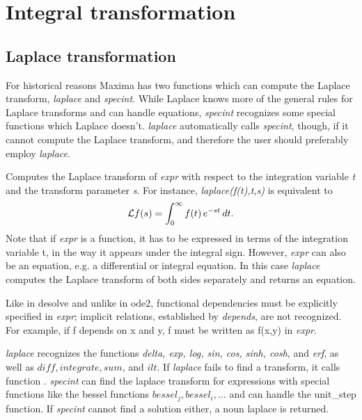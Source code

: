 \documentclass[../Maxima_Workbook.tex]{subfiles}
\begin{document}
	
\chapter{Integral transformation}

\section{Laplace transformation}

For historical reasons Maxima has two functions which can compute the Laplace transform, \emph{laplace} and \emph{specint}. While Laplace knows more of the general rules for Laplace transforms and can handle equations, \emph{specint} recognizes some special functions which Laplace doesn't. \emph{laplace} automatically calls \emph{specint}, though, if it cannot compute the Laplace transform, and therefore the user should preferably employ \emph{laplace}.

\lzz {} \hfill \tcr{[function]}

\lz Computes the Laplace transform of \emph{expr} with respect to the integration variable \emph{t} and the transform parameter \emph{s}. For instance, \emph{laplace(f(t),t,s)} is equivalent to
\begin{equation}\label{IT2}
	\mathcal{L}f(s) = \int_{0}^{\infty} f(t) \, e^{-st} \, dt.
\end{equation}
Note that if \emph{expr} is a function, it has to be expressed in terms of the integration variable t, in the way it appears under the integral sign. However, \emph{expr} can also be an equation, e.g. a differential or integral equation. In this case \emph{laplace} computes the Laplace transform of both sides separately and returns an equation.

\lz Like in desolve and unlike in ode2, functional dependencies must be explicitly specified in \emph{expr}; implicit relations, established by \emph{depends}, are not recognized. For example, if f depends on x and y, f must be written as f(x,y) in \emph{expr}.

\lz \emph{laplace} recognizes the functions \emph{delta, exp, log, sin, cos, sinh, cosh}, and \emph{erf}, as well as $ diff, integrate, sum $, and $ ilt $. If \emph{laplace} fails to find a transform, it calls function . \emph{specint} can find the laplace transform for expressions with special functions like the bessel functions $ bessel_j, bessel_i,\dots $ and can handle the unit\_step function. If \emph{specint} cannot find a solution either, a noun laplace is returned.
\end{document}
